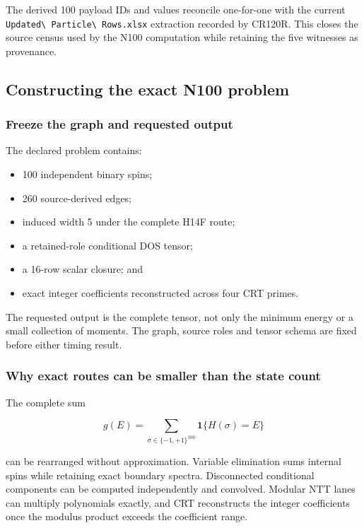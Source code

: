 The derived 100 payload IDs and values reconcile one-for-one with the
current \nolinkurl{Updated\ Particle\ Rows.xlsx} extraction recorded by
CR120R. This closes the source census used by the N100 computation while
retaining the five witnesses as provenance.

\subsection{Constructing the exact N100
problem}\label{viii-ch01-constructing-the-exact-n100-problem}

\subsubsection{Freeze the graph and requested
output}\label{viii-ch01-freeze-the-graph-and-requested-output}

The declared problem contains:

\begin{itemize}
\tightlist
\item
  100 independent binary spins;
\item
  260 source-derived edges;
\item
  induced width 5 under the complete H14F route;
\item
  a retained-role conditional DOS tensor;
\item
  a 16-row scalar closure; and
\item
  exact integer coefficients reconstructed across four CRT primes.
\end{itemize}

The requested output is the complete tensor, not only the minimum energy
or a small collection of moments. The graph, source roles and tensor
schema are fixed before either timing result.

\subsubsection{Why exact routes can be smaller than the state
count}\label{viii-ch01-why-exact-routes-can-be-smaller-than-the-state-count}

The complete sum

\[
g(E)=\sum_{\sigma\in\{-1,+1\}^{100}}
\mathbf 1\{H(\sigma)=E\}
\]

can be rearranged without approximation. Variable elimination sums
internal spins while retaining exact boundary spectra. Disconnected
conditional components can be computed independently and convolved.
Modular NTT lanes can multiply polynomials exactly, and CRT reconstructs
the integer coefficients once the modulus product exceeds the
coefficient range.

